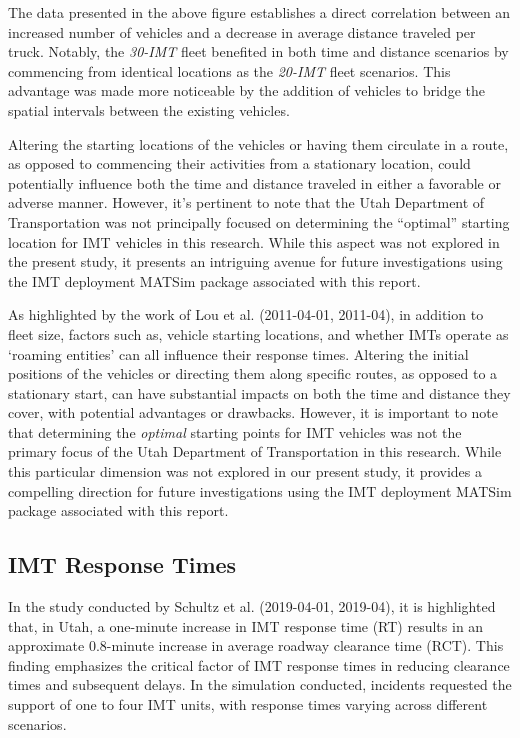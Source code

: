 \documentclass[fancy, oneside, mastersfancy, ms]{byuthesis}
\begin{document}
The data presented in the above figure establishes a direct correlation
between an increased number of vehicles and a decrease in average
distance traveled per truck. Notably, the \emph{30-IMT} fleet benefited
in both time and distance scenarios by commencing from identical
locations as the \emph{20-IMT} fleet scenarios. This advantage was made
more noticeable by the addition of vehicles to bridge the spatial
intervals between the existing vehicles.

Altering the starting locations of the vehicles or having them circulate
in a route, as opposed to commencing their activities from a stationary
location, could potentially influence both the time and distance
traveled in either a favorable or adverse manner. However, it's
pertinent to note that the Utah Department of Transportation was not
principally focused on determining the ``optimal'' starting location for
IMT vehicles in this research. While this aspect was not explored in the
present study, it presents an intriguing avenue for future
investigations using the IMT deployment MATSim package associated with
this report.

As highlighted by the work of Lou et al. (2011-04-01, 2011-04), in
addition to fleet size, factors such as, vehicle starting locations, and
whether IMTs operate as `roaming entities' can all influence their
response times. Altering the initial positions of the vehicles or
directing them along specific routes, as opposed to a stationary start,
can have substantial impacts on both the time and distance they cover,
with potential advantages or drawbacks. However, it is important to note
that determining the \emph{optimal} starting points for IMT vehicles was
not the primary focus of the Utah Department of Transportation in this
research. While this particular dimension was not explored in our
present study, it provides a compelling direction for future
investigations using the IMT deployment MATSim package associated with
this report.

\hypertarget{imt-response-times}{%
\subsection{IMT Response Times}\label{imt-response-times}}

In the study conducted by Schultz et al. (2019-04-01, 2019-04), it is
highlighted that, in Utah, a one-minute increase in IMT response time
(RT) results in an approximate 0.8-minute increase in average roadway
clearance time (RCT). This finding emphasizes the critical factor of IMT
response times in reducing clearance times and subsequent delays. In the
simulation conducted, incidents requested the support of one to four IMT
units, with response times varying across different scenarios.
\end{document}
